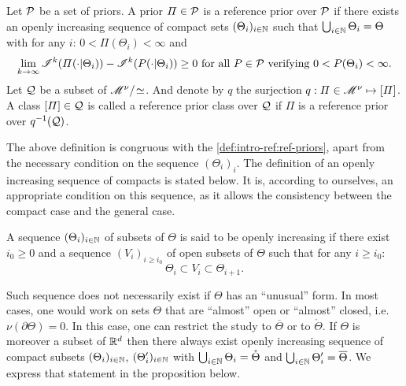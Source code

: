 \begin{defi}
    Let $\mathcal{P}$ be a set of priors. A prior $\varPi\in\mathcal{P}$ is a reference prior over $\mathcal{P}$ if there exists an openly increasing sequence of compact sets $(\Theta_i)_{i\in\mathbb{N}}$ such that $\bigcup_{i\in\mathbb{N}}\Theta_i=\Theta$ with for any $i$: $0<\varPi(\Theta_i)<\infty$ and
    \begin{equation}
        \lim_{k\rightarrow\infty}\sI^k(\varPi(\cdot|\Theta_i)) - \sI^k(P(\cdot|\Theta_i))  \geq 0 \text{\ for all\ } P\in\cP\text{\ verifying\ }0<P(\Theta_i)<\infty.
    \end{equation}
    Let $\mathcal{Q}$ be a subset of $\mathscr{M}^\nu/\!\simeq$.
    And denote by $q$ the surjection $q:\varPi\in\mathscr{M}^\nu\mapsto[\varPi]$.  
    A class $[\varPi]\in\mathcal{Q}$ is called a reference prior class over $\mathcal{Q}$ if $\varPi$ is a reference prior over $q^{-1}(\mathcal{Q})$.
\end{defi}



The above definition is congruous with the \cref{def:intro-ref:ref-priors}, apart from the necessary condition on the sequence $(\Theta_i)_i$. 
The definition of an openly increasing sequence of compacts
is stated below. It is, according to ourselves, an appropriate condition on this sequence, as it allows the consistency between the compact case and the general case.


\begin{defi}
    A sequence $(\Theta_i)_{i\in \mathbb{N}}$ of subsets of $\Theta$ is said to be openly increasing if there exist $i_0\geq0$ and a sequence $(V_i)_{i\geq i_0}$ of open subsets of $\Theta$ such that for any $i\geq i_0$:
    \begin{equation}
        \Theta_i\subset V_i\subset\Theta_{i+1}.
    \end{equation}
\end{defi}


Such sequence does not necessarily exist if $\Theta$ has an ``unusual'' form. 
In most cases, one would work on sets $\Theta$ that are ``almost'' open or ``almost'' closed, i.e. $\nu(\partial\Theta)=0$. In this case, one can restrict the study to $\overline{\Theta}$ or to $\mathring{\Theta}$. If $\Theta$ is moreover a subset of $\mathbb{R}^d$ then there always exist openly increasing sequence of compact subsets $(\Theta_i)_{i\in\mathbb{N}}$, $(\Theta'_i)_{i\in\mathbb{N}}$ with $\bigcup_{i\in\mathbb{N}}\Theta_i=\mathring{\Theta}$ and $\bigcup_{i\in\mathbb{N}}\Theta_i'=\overline{\Theta}$. We express that statement in the proposition below.


